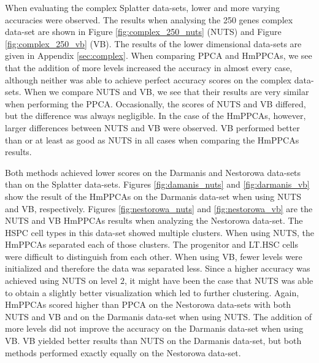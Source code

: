 When evaluating the complex Splatter data-sets, lower and more varying accuracies were observed. The results when analysing the 250 genes complex data-set are shown in Figure \ref{fig:complex_250_nuts} (NUTS) and Figure  \ref{fig:complex_250_vb} (VB). The results of the lower dimensional data-sets are given in Appendix \ref{sec:complex}. When comparing PPCA and HmPPCAs, we see that the addition of more levels increased the accuracy in almost every case, although neither was able to achieve perfect accuracy scores on the complex data-sets. When we compare NUTS and VB, we see that their results are very similar when performing the PPCA. Occasionally, the scores of NUTS and VB differed, but the difference was always negligible. In the case of the HmPPCAs, however, larger differences between NUTS and VB were observed. VB performed better than or at least as good as NUTS in all cases when comparing the HmPPCAs results.

Both methods achieved lower scores on the Darmanis and Nestorowa data-sets than on the Splatter data-sets. Figures \ref{fig:damanis_nuts} and \ref{fig:darmanis_vb} show the result of the HmPPCAs on the Darmanis data-set when using NUTS and VB, respectively. Figures \ref{fig:nestorowa_nuts} and \ref{fig:nestorowa_vb} are the NUTS and VB HmPPCAs results when analyzing the Nestorowa data-set. The HSPC cell types in this data-set showed multiple clusters. When using NUTS, the HmPPCAs separated each of those clusters. The progenitor and LT.HSC cells were difficult to distinguish from each other. When using VB, fewer levels were initialized and therefore the data was separated less. Since a higher accuracy was achieved using NUTS on level $2$, it might have been the case that NUTS was able to obtain a slightly better visualization which led to further clustering. Again, HmPPCAs scored higher than PPCA on the Nestorowa data-sets with both NUTS and VB and on the Darmanis data-set when using NUTS. The addition of more levels did not improve the accuracy on the Darmanis data-set when using VB. VB yielded better results than NUTS on the Darmanis data-set, but both methods performed exactly equally on the Nestorowa data-set.



